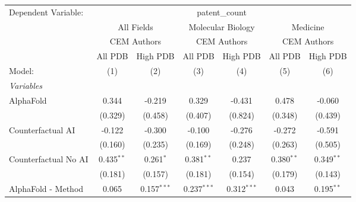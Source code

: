 \begingroup
\centering
\begin{tabular}{lcccccc}
   \tabularnewline \midrule \midrule
   Dependent Variable: & \multicolumn{6}{c}{patent\_count}\\
 & \multicolumn{2}{c}{All Fields} & \multicolumn{2}{c}{Molecular Biology} & \multicolumn{2}{c}{Medicine} \\
\cmidrule(lr){2-3} \cmidrule(lr){4-5} \cmidrule(lr){6-7}
 & \multicolumn{2}{c}{CEM Authors} & \multicolumn{2}{c}{CEM Authors} & \multicolumn{2}{c}{CEM Authors} \\
\cmidrule(lr){2-3} \cmidrule(lr){4-5} \cmidrule(lr){6-7}
 & \multicolumn{1}{c}{All PDB} & \multicolumn{1}{c}{High PDB} & \multicolumn{1}{c}{All PDB} & \multicolumn{1}{c}{High PDB} & \multicolumn{1}{c}{All PDB} & \multicolumn{1}{c}{High PDB} \\
\cmidrule(lr){2-2} \cmidrule(lr){3-3} \cmidrule(lr){4-4} \cmidrule(lr){5-5} \cmidrule(lr){6-6} \cmidrule(lr){7-7}
   Model:                                                     & (1)          & (2)           & (3)           & (4)           & (5)           & (6)\\  
   \midrule
   \emph{Variables}\\
   AlphaFold                                                  & 0.344        & -0.219        & 0.329         & -0.431        & 0.478         & -0.060\\   
                                                              & (0.329)      & (0.458)       & (0.407)       & (0.824)       & (0.348)       & (0.439)\\   
   Counterfactual AI                                          & -0.122       & -0.300        & -0.100        & -0.276        & -0.272        & -0.591\\   
                                                              & (0.160)      & (0.235)       & (0.169)       & (0.248)       & (0.263)       & (0.505)\\   
   Counterfactual No AI                                       & 0.435$^{**}$ & 0.261$^{*}$   & 0.381$^{**}$  & 0.237         & 0.380$^{**}$  & 0.349$^{**}$\\   
                                                              & (0.181)      & (0.157)       & (0.181)       & (0.154)       & (0.179)       & (0.143)\\   
   AlphaFold - Method                                         & 0.065        & 0.157$^{***}$ & 0.237$^{***}$ & 0.312$^{***}$ & 0.043         & 0.195$^{**}$\\   

\end{tabular}
